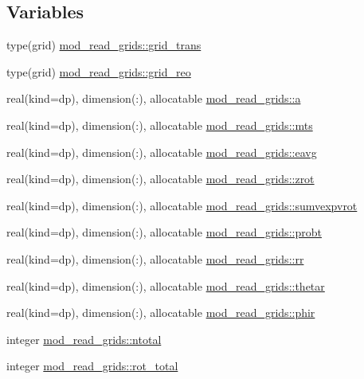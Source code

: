 \subsection*{Variables}
\begin{DoxyCompactItemize}
\item 
type(grid) \hyperlink{namespacemod__read__grids_ab09110371e13fa11f9a839bde8da8fc7}{mod\+\_\+read\+\_\+grids\+::grid\+\_\+trans}
\item 
type(grid) \hyperlink{namespacemod__read__grids_add45049d527e2c5d636d8382bfe892e8}{mod\+\_\+read\+\_\+grids\+::grid\+\_\+reo}
\item 
real(kind=dp), dimension(\+:), allocatable \hyperlink{namespacemod__read__grids_a1cd0dd1119fe3ce58917bf6aaf7abebf}{mod\+\_\+read\+\_\+grids\+::a}
\item 
real(kind=dp), dimension(\+:), allocatable \hyperlink{namespacemod__read__grids_af619057af0e7ce4717a95d4239422912}{mod\+\_\+read\+\_\+grids\+::mts}
\item 
real(kind=dp), dimension(\+:), allocatable \hyperlink{namespacemod__read__grids_af9747d65a3c7dd6876ab803f0a06e8e9}{mod\+\_\+read\+\_\+grids\+::eavg}
\item 
real(kind=dp), dimension(\+:), allocatable \hyperlink{namespacemod__read__grids_aa1dc0d4a91ccebc952bde4d1f380b174}{mod\+\_\+read\+\_\+grids\+::zrot}
\item 
real(kind=dp), dimension(\+:), allocatable \hyperlink{namespacemod__read__grids_aff025afae6b2b208286c65a85cd8f82a}{mod\+\_\+read\+\_\+grids\+::sumvexpvrot}
\item 
real(kind=dp), dimension(\+:), allocatable \hyperlink{namespacemod__read__grids_a019fc7a33467abb84318794f59bff9cd}{mod\+\_\+read\+\_\+grids\+::probt}
\item 
real(kind=dp), dimension(\+:), allocatable \hyperlink{namespacemod__read__grids_a668db35acd10bd5a0c686c3ea19da6c2}{mod\+\_\+read\+\_\+grids\+::rr}
\item 
real(kind=dp), dimension(\+:), allocatable \hyperlink{namespacemod__read__grids_a40918dc75ea77a2757ea8d8dd43beb9e}{mod\+\_\+read\+\_\+grids\+::thetar}
\item 
real(kind=dp), dimension(\+:), allocatable \hyperlink{namespacemod__read__grids_aa3da94e35a501dc0ed782d7019127514}{mod\+\_\+read\+\_\+grids\+::phir}
\item 
integer \hyperlink{namespacemod__read__grids_aa54b9eaa554b8519d41c5e616479d343}{mod\+\_\+read\+\_\+grids\+::ntotal}
\item 
integer \hyperlink{namespacemod__read__grids_aca954e32e5f53302912f372a99affe97}{mod\+\_\+read\+\_\+grids\+::rot\+\_\+total}
\end{DoxyCompactItemize}
